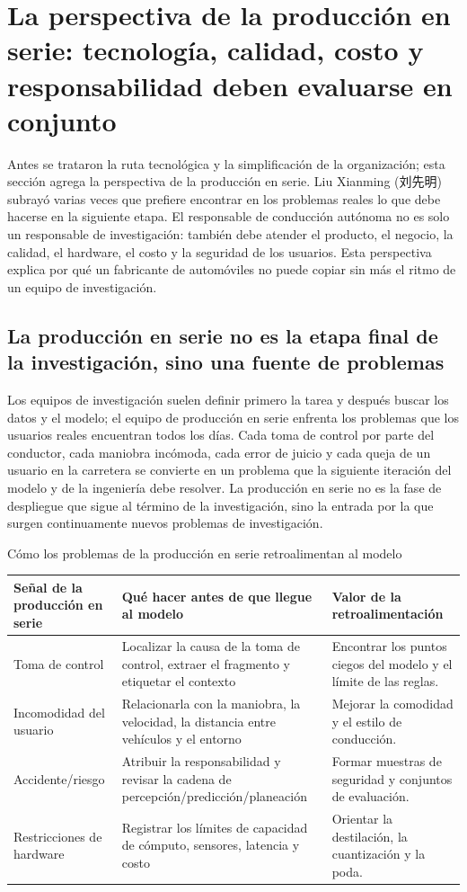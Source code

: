 \section{La perspectiva de la producción en serie: tecnología, calidad, costo y responsabilidad deben evaluarse en conjunto}

Antes se trataron la ruta tecnológica y la simplificación de la organización; esta sección agrega la perspectiva de la producción en serie. Liu Xianming (刘先明) subrayó varias veces que prefiere encontrar en los problemas reales lo que debe hacerse en la siguiente etapa. El responsable de conducción autónoma no es solo un responsable de investigación: también debe atender el producto, el negocio, la calidad, el hardware, el costo y la seguridad de los usuarios. Esta perspectiva explica por qué un fabricante de automóviles no puede copiar sin más el ritmo de un equipo de investigación.

\subsection{La producción en serie no es la etapa final de la investigación, sino una fuente de problemas}

Los equipos de investigación suelen definir primero la tarea y después buscar los datos y el modelo; el equipo de producción en serie enfrenta los problemas que los usuarios reales encuentran todos los días. Cada toma de control por parte del conductor, cada maniobra incómoda, cada error de juicio y cada queja de un usuario en la carretera se convierte en un problema que la siguiente iteración del modelo y de la ingeniería debe resolver. La producción en serie no es la fase de despliegue que sigue al término de la investigación, sino la entrada por la que surgen continuamente nuevos problemas de investigación.

\begin{knowledgebox}{Cómo los problemas de la producción en serie retroalimentan al modelo}
\begin{tabularx}{\textwidth}{p{}p{}X}
\toprule
Señal de la producción en serie & Qué hacer antes de que llegue al modelo & Valor de la retroalimentación \\
\midrule
Toma de control & Localizar la causa de la toma de control, extraer el fragmento y etiquetar el contexto & Encontrar los puntos ciegos del modelo y el límite de las reglas. \\
Incomodidad del usuario & Relacionarla con la maniobra, la velocidad, la distancia entre vehículos y el entorno & Mejorar la comodidad y el estilo de conducción. \\
Accidente/riesgo & Atribuir la responsabilidad y revisar la cadena de percepción/predicción/planeación & Formar muestras de seguridad y conjuntos de evaluación. \\
Restricciones de hardware & Registrar los límites de capacidad de cómputo, sensores, latencia y costo & Orientar la destilación, la cuantización y la poda. \\
\bottomrule
\end{tabularx}
\end{knowledgebox}

